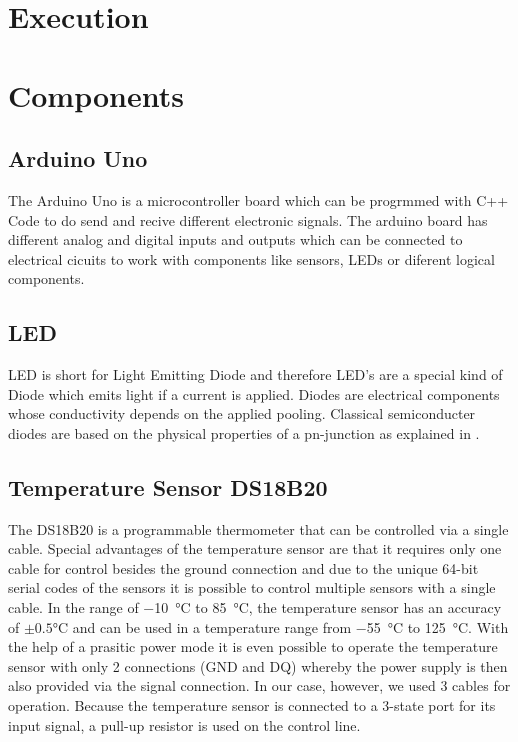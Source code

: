 \section{Execution}
\label{sec:execution}
\section{Components}
\subsection{Arduino Uno}
The Arduino Uno is a microcontroller board which can be progrmmed with C++ Code to do send and recive different electronic signals.
The arduino board has different analog and digital inputs and outputs which can be connected to electrical cicuits to work with components like sensors, LEDs or diferent logical components.
\subsection{LED}
LED is short for Light Emitting Diode and therefore LED's are a special kind of Diode which emits light if a current is applied.
Diodes are electrical components whose conductivity depends on the applied pooling.
Classical semiconducter diodes are based on the physical properties of a pn-junction as explained in \cite{elektronik-kompendium}.
\subsection{Temperature Sensor DS18B20}
The DS18B20 is a programmable thermometer that can be controlled via a single cable.
Special advantages of the temperature sensor are that it requires only one cable for control besides the ground connection and due to the unique 64-bit serial codes of the sensors it is possible to control multiple sensors with a single cable.
In the range of \SI{-10}{\celsius} to \SI{85}{\celsius}, the temperature sensor has an accuracy of $\pm 0.5$\si{\celsius} and can be used in a temperature range from \SI{-55}{\celsius} to \SI{125}{\celsius}.
With the help of a prasitic power mode it is even possible to operate the temperature sensor with only 2 connections (GND and DQ) whereby the power supply is then also provided via the signal connection. In our case, however, we used 3 cables for operation.
Because the temperature sensor is connected to a 3-state port for its input signal, a pull-up resistor is used on the control line.

